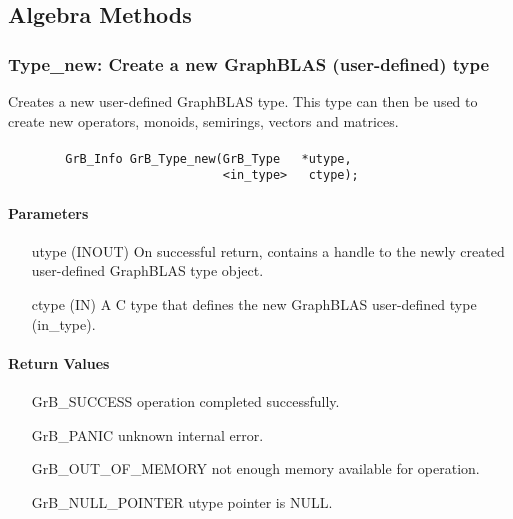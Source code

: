 \subsection{Algebra Methods}
\label{Sec:AlgebraMethods}


\subsubsection{{\sf Type\_new}: Create a new GraphBLAS (user-defined) type}

Creates a new user-defined GraphBLAS type. This type can then be used to create new
operators, monoids, semirings, vectors and matrices.

\paragraph{\syntax}

\begin{verbatim}
        GrB_Info GrB_Type_new(GrB_Type	 *utype,
                              <in_type>	  ctype);
\end{verbatim}

\paragraph{Parameters}

\begin{itemize}[leftmargin=1.1in]
    \item[{\sf utype}] ({\sf INOUT}) On successful return, contains a handle 
                                     to the newly created user-defined GraphBLAS 
                                     type object.
	\item[{\sf ctype}] ({\sf IN})    A C type that defines the new GraphBLAS 
                                     user-defined type ({\sf in\_type}).
\end{itemize}

\paragraph{Return Values}

\begin{itemize}[leftmargin=2.1in]
\item[{\sf GrB\_SUCCESS}]           operation completed successfully.
\item[{\sf GrB\_PANIC}]             unknown internal error.
\item[{\sf GrB\_OUT\_OF\_MEMORY}]          not enough memory available for operation.
\item[{\sf GrB\_NULL\_POINTER}]    {\sf utype} pointer is {\sf NULL}.
\end{itemize}

